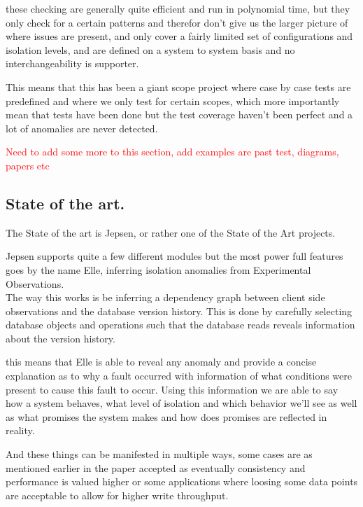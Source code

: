 \documentclass[
  a4paper,  %
  twoside,  %
  bibliography=totoc,
  headsepline,
  cleardoublepage=empty,
  parskip=half,
  draft=false
]{scrbook}
\begin{document}
these checking are generally quite efficient and run in polynomial time, but they only check for a certain patterns and therefor don't give us the larger picture of where issues are present, and only cover a fairly limited set of configurations and isolation levels, and are defined on a system to system basis and no interchangeability is supporter.

This means that this has been a giant scope project where case by case tests are predefined and where we only test for certain scopes, which more importantly mean that tests have been done but the test coverage haven't been perfect and a lot of anomalies are never detected.

\textcolor{red}{Need to add some more to this section, add examples are past test, diagrams, papers etc}

\subsection{State of the art.}

The State of the art is Jepsen, or rather one of the State of the Art projects.

Jepsen supports quite a few different modules but the most power full features goes by the name Elle, inferring isolation anomalies from Experimental Observations. \\

The way this works is be inferring a dependency graph between client side observations and the database version history. This is done by carefully selecting database objects and operations such that the database reads reveals information about the version history. 

this means that Elle is able to reveal any anomaly and provide a concise explanation as to why a fault occurred with information of what conditions were present to cause this fault to occur. Using this information we are able to say how a system behaves, what level of isolation and which behavior we'll see as well as what promises the system makes and how does promises are reflected in reality.

And these things can be manifested in multiple ways, some cases are as mentioned earlier in the paper accepted as eventually consistency and performance is valued higher or some applications where loosing some data points are acceptable to allow for higher write throughput.
\end{document}
